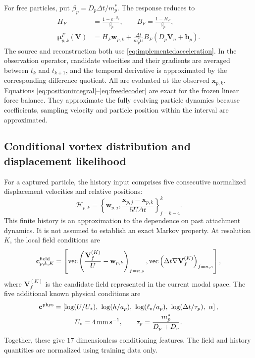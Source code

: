 \documentclass[11pt]{article}
\numberwithin{equation}{section}
\begin{document}
For free particles, put $\beta_p=D_p\Delta t/m_p^*$. The response reduces to
\begin{equation}
 \begin{aligned}
 H_F&=\frac{1-e^{-\beta_p}}{\beta_p},\qquad
 B_F=\frac{1-H_F}{\beta_p},\\
 \bm\mu^F_{p,k}(\mathbf V)
 &=H_F\mathbf w_{p,k}
  +\frac{\Delta t}{m_p^*U}B_F(D_p\mathbf V_n+\mathbf b_p).
 \end{aligned}
 \label{eq:freedecoder}
\end{equation}
The source and reconstruction both use \eqref{eq:implementedacceleration}. In the observation operator, candidate velocities and their gradients are averaged between $t_k$ and $t_{k+1}$, and the temporal derivative is approximated by the corresponding difference quotient. All are evaluated at the observed $\mathbf x_{p,k}$. Equations \eqref{eq:positionintegral}--\eqref{eq:freedecoder} are exact for the frozen linear force balance. They approximate the fully evolving particle dynamics because coefficients, sampling velocity and particle position within the interval are approximated.

\subsection{Conditional vortex distribution and displacement likelihood}
\label{sec:probability}

For a captured particle, the history input comprises five consecutive normalized displacement velocities and relative positions:
\begin{equation}
 \mathcal H_{p,k}=
 \left\{\mathbf w_{p,j},
 \frac{\mathbf x_{p,j}-\mathbf x_{p,k}}{5U\Delta t}
 \right\}_{j=k-4}^{k}.
 \label{eq:history}
\end{equation}
This finite history is an approximation to the dependence on past attachment dynamics. It is not assumed to establish an exact Markov property. At resolution $K$, the local field conditions are
\begin{equation}
 \mathbf c^{\rm field}_{p,k,K}=
 \left[
 \operatorname{vec}\left(\frac{\mathbf V_f^{(K)}}{U}-\mathbf w_{p,k}\right)_{f=n,s},
 \operatorname{vec}\left(\Delta t\nabla\mathbf V_f^{(K)}\right)_{f=n,s}
 \right],
 \label{eq:fieldconditions}
\end{equation}
where $\mathbf V_f^{(K)}$ is the candidate field represented in the current modal space. The five additional known physical conditions are
\begin{equation}
 \begin{gathered}
 \mathbf c^{\rm phys}=\left[
 \log(U/U_*),\ \log(h/a_p),\ \log(\ell_e/a_p),\
 \log(\Delta t/\tau_p),\ \alpha\right],\\
 U_*=4\,\mathrm{mm\,s^{-1}},\qquad
 \tau_p=\frac{m_p^*}{D_p+D_v}.
 \end{gathered}
 \label{eq:physicalconditions}
\end{equation}
Together, these give $17$ dimensionless conditioning features. The field and history quantities are normalized using training data only.
\end{document}
